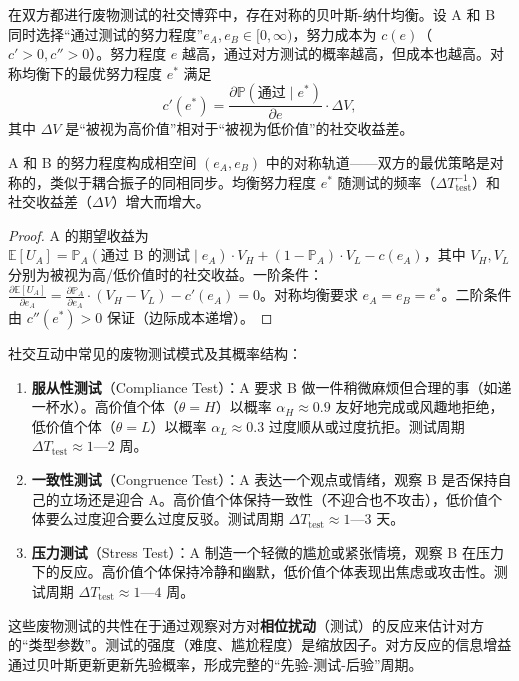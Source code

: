 \begin{theorem}[废物测试的纳什均衡]\label{thm:shittest_nash}
在双方都进行废物测试的社交博弈中，存在对称的贝叶斯-纳什均衡。设 A 和 B 同时选择“通过测试的努力程度”$e_A, e_B \in [0, \infty)$，努力成本为 $c(e)$（$c' > 0, c'' > 0$）。努力程度 $e$ 越高，通过对方测试的概率越高，但成本也越高。对称均衡下的最优努力程度 $e^*$ 满足
\[
c'(e^*) = \frac{\partial \mathbb{P}(\text{通过} \mid e^*)}{\partial e} \cdot \Delta V,
\]
其中 $\Delta V$ 是“被视为高价值”相对于“被视为低价值”的社交收益差。

A 和 B 的努力程度构成相空间 $(e_A, e_B)$ 中的对称轨道——双方的最优策略是对称的，类似于耦合振子的同相同步。均衡努力程度 $e^*$ 随测试的频率（$\Delta T_{\text{test}}^{-1}$）和社交收益差（$\Delta V$）增大而增大。
\end{theorem}

\begin{proof}
A 的期望收益为 $\mathbb{E}[U_A] = \mathbb{P}_A(\text{通过 B 的测试} \mid e_A) \cdot V_H + (1 - \mathbb{P}_A) \cdot V_L - c(e_A)$，其中 $V_H, V_L$ 分别为被视为高/低价值时的社交收益。一阶条件：$\frac{\partial \mathbb{E}[U_A]}{\partial e_A} = \frac{\partial \mathbb{P}_A}{\partial e_A} \cdot (V_H - V_L) - c'(e_A) = 0$。对称均衡要求 $e_A = e_B = e^*$。二阶条件由 $c''(e^*) > 0$ 保证（边际成本递增）。
\end{proof}

\begin{example}[社交场合中的经典废物测试]
社交互动中常见的废物测试模式及其概率结构：
\begin{enumerate}[label=(\roman*)]
    \item \textbf{服从性测试}（Compliance Test）：A 要求 B 做一件稍微麻烦但合理的事（如递一杯水）。高价值个体（$\theta = H$）以概率 $\alpha_H \approx 0.9$ 友好地完成或风趣地拒绝，低价值个体（$\theta = L$）以概率 $\alpha_L \approx 0.3$ 过度顺从或过度抗拒。测试周期 $\Delta T_{\text{test}} \approx 1$—$2$ 周。
    \item \textbf{一致性测试}（Congruence Test）：A 表达一个观点或情绪，观察 B 是否保持自己的立场还是迎合 A。高价值个体保持一致性（不迎合也不攻击），低价值个体要么过度迎合要么过度反驳。测试周期 $\Delta T_{\text{test}} \approx 1$—$3$ 天。
    \item \textbf{压力测试}（Stress Test）：A 制造一个轻微的尴尬或紧张情境，观察 B 在压力下的反应。高价值个体保持冷静和幽默，低价值个体表现出焦虑或攻击性。测试周期 $\Delta T_{\text{test}} \approx 1$—$4$ 周。
\end{enumerate}
这些废物测试的共性在于通过观察对方对\textbf{相位扰动}（测试）的反应来估计对方的“类型参数”。测试的强度（难度、尴尬程度）是缩放因子。对方反应的信息增益通过贝叶斯更新更新先验概率，形成完整的“先验-测试-后验”周期。
\end{example}

